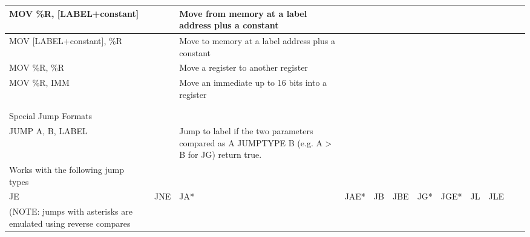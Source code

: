 \documentclass[a4paper]{article}
\begin{document}
\begin{tabular}{|l|l|l|l|l|l|l|l|l|l|l|l|}
\hline
MOV \%R, [LABEL+constant]&&Move from memory at a label address plus a constant&&&&&&&
&&\\
\hline
{} MOV [LABEL+constant], \%R&&Move to memory at a label address plus a constant&&&&&&&
&&\\
\hline
MOV \%R, \%R&&Move a register to another register&&&&&&&
&&\\
\hline
{} MOV \%R, IMM&&Move an immediate up to 16 bits into a register&&&&&&&
&&\\
\hline
&&&&&&&&&
&&\\
\hline
{} &&&&&&&&&
&&\\
\hline
Special Jump Formats&&&&&&&&&
&&\\
\hline
{} JUMP A, B, LABEL&&Jump to label if the two parameters compared as A JUMPTYPE B (e.g. A > B for JG) return true.&&&&&&&
&&\\
\hline
Works with the following jump types&&&&&&&&&
&&\\
\hline
{} JE& JNE& JA*& JAE*& JB& JBE& JG*& JGE*& JL& JLE 
&&\\
\hline
(NOTE: jumps with asterisks are emulated using reverse compares&&&&&&&&&\end{tabular}
\end{document}
